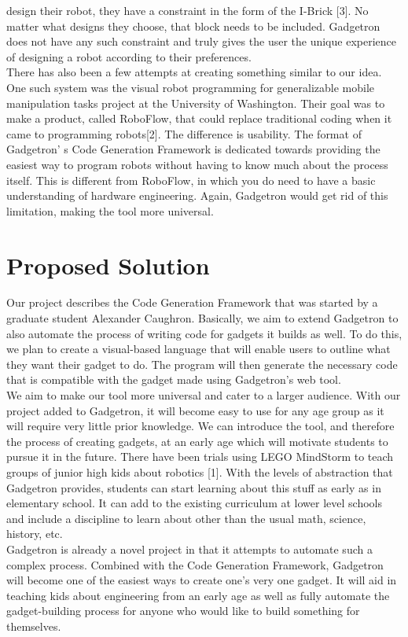 \documentclass[12pt]{article}
\begin{document}
	design their robot, they have a constraint in the form of the I-Brick [3]. No matter what designs they choose, that block needs to be included. Gadgetron does not have any such constraint and truly gives the user the unique 
	experience of designing a robot according to their preferences.\\[7pt]
	There has also been a few attempts at creating something similar to our idea. One such system was the visual robot programming for generalizable mobile manipulation tasks project at the University of Washington. Their goal 
	was to make a product, called RoboFlow, that could replace traditional coding when it came to programming robots[2]. The difference is usability. The format of Gadgetron' s Code Generation Framework is dedicated towards
	providing the easiest way to program robots without having to know much about the process itself. This is different from RoboFlow, in which you do need to have a basic understanding of hardware engineering. Again, Gadgetron would get rid of this limitation, making the tool more universal.

\section{Proposed Solution}
	Our project describes the Code Generation Framework that was started by a graduate student Alexander Caughron. Basically, we aim to extend Gadgetron to also automate the process of writing code for gadgets it builds as well. 
	To do this, we plan to create a visual-based language that will enable users to outline what they want their gadget to do. The program will then generate the necessary code that is compatible with the gadget made using 
	Gadgetron's web tool.\\[7pt]
	We aim to make our tool more universal and cater to a larger audience. With our project added to Gadgetron, it will become easy to use for any age group as it will require very little prior knowledge. We can introduce the 
	tool, and therefore the process of creating gadgets, at an early age which will motivate students to pursue it in the future. There have been trials using LEGO MindStorm to teach groups of junior high kids about robotics [1]. 
	With the levels of abstraction that Gadgetron provides, students can start learning about this stuff as early as in elementary school. It can add to the existing curriculum at lower level schools and include a discipline to learn
	about other than the usual math, science, history, etc.\\[7pt]
	Gadgetron is already a novel project in that it attempts to automate such a complex process.  Combined with the Code Generation Framework, Gadgetron will become one of the easiest ways to create one's very one
	gadget. It will aid in teaching kids about engineering from an early age as well as fully automate the gadget-building process for anyone who would like to build something for themselves. 
\end{document}
